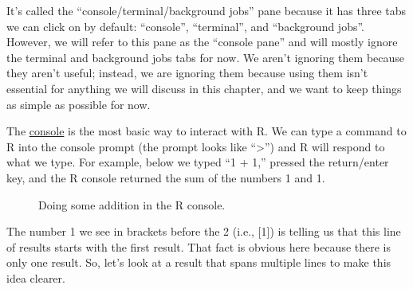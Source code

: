 \documentclass[
  letterpaper,
  DIV=11,
  numbers=noendperiod]{scrreprt}
\begin{document}
It's called the ``console/terminal/background jobs'' pane because it has
three tabs we can click on by default: ``console'', ``terminal'', and
``background jobs''. However, we will refer to this pane as the
``console pane'' and will mostly ignore the terminal and background jobs
tabs for now. We aren't ignoring them because they aren't useful;
instead, we are ignoring them because using them isn't essential for
anything we will discuss in this chapter, and we want to keep things as
simple as possible for now.

The \hyperref[glossary-console]{console} is the most basic way to
interact with R. We can type a command to R into the console prompt (the
prompt looks like ``\textgreater{}'') and R will respond to what we
type. For example, below we typed ``1 + 1,'' pressed the return/enter
key, and the R console returned the sum of the numbers 1 and 1.

\begin{figure}


\caption{\label{fig-one-plus-one}Doing some addition in the R console.}

\end{figure}%

The number 1 we see in brackets before the 2 (i.e., {[}1{]}) is telling
us that this line of results starts with the first result. That fact is
obvious here because there is only one result. So, let's look at a
result that spans multiple lines to make this idea clearer.
\end{document}
